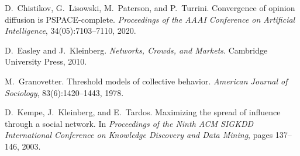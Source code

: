 \documentclass[11pt]{article}
\begin{document}

\begin{thebibliography}{10}

D.~Chistikov, G.~Lisowski, M.~Paterson, and P.~Turrini.
Convergence of opinion diffusion is {PSPACE}-complete.
\emph{Proceedings of the AAAI Conference on Artificial Intelligence}, 34(05):7103--7110, 2020.

D.~Easley and J.~Kleinberg.
\emph{Networks, Crowds, and Markets}.
Cambridge University Press, 2010.

M.~Granovetter.
Threshold models of collective behavior.
\emph{American Journal of Sociology}, 83(6):1420--1443, 1978.

D.~Kempe, J.~Kleinberg, and E.~Tardos.
Maximizing the spread of influence through a social network.
In \emph{Proceedings of the Ninth ACM SIGKDD International Conference on Knowledge Discovery and Data Mining}, pages 137--146, 2003.

\end{thebibliography}
\end{document}
